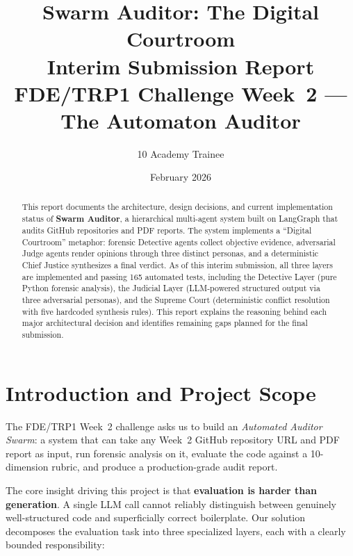 \documentclass[12pt,a4paper]{article}
\title{%
  \vspace{-1cm}
  \textbf{Swarm Auditor: The Digital Courtroom}\\[0.3cm]
  \Large Interim Submission Report\\[0.2cm]
  \large FDE/TRP1 Challenge Week~2 --- The Automaton Auditor
}
\author{10 Academy Trainee}
\date{February 2026}
\begin{document}
\maketitle
\thispagestyle{fancy}

\begin{abstract}
This report documents the architecture, design decisions, and current implementation status of \textbf{Swarm Auditor}, a hierarchical multi-agent system built on LangGraph that audits GitHub repositories and PDF reports. The system implements a ``Digital Courtroom'' metaphor: forensic Detective agents collect objective evidence, adversarial Judge agents render opinions through three distinct personas, and a deterministic Chief Justice synthesizes a final verdict. As of this interim submission, all three layers are implemented and passing 165 automated tests, including the Detective Layer (pure Python forensic analysis), the Judicial Layer (LLM-powered structured output via three adversarial personas), and the Supreme Court (deterministic conflict resolution with five hardcoded synthesis rules). This report explains the reasoning behind each major architectural decision and identifies remaining gaps planned for the final submission.
\end{abstract}

\tableofcontents
\newpage

\section{Introduction and Project Scope}

The FDE/TRP1 Week~2 challenge asks us to build an \emph{Automated Auditor Swarm}: a system that can take any Week~2 GitHub repository URL and PDF report as input, run forensic analysis on it, evaluate the code against a 10-dimension rubric, and produce a production-grade audit report.

The core insight driving this project is that \textbf{evaluation is harder than generation}. A single LLM call cannot reliably distinguish between genuinely well-structured code and superficially correct boilerplate. Our solution decomposes the evaluation task into three specialized layers, each with a clearly bounded responsibility:
\end{document}
